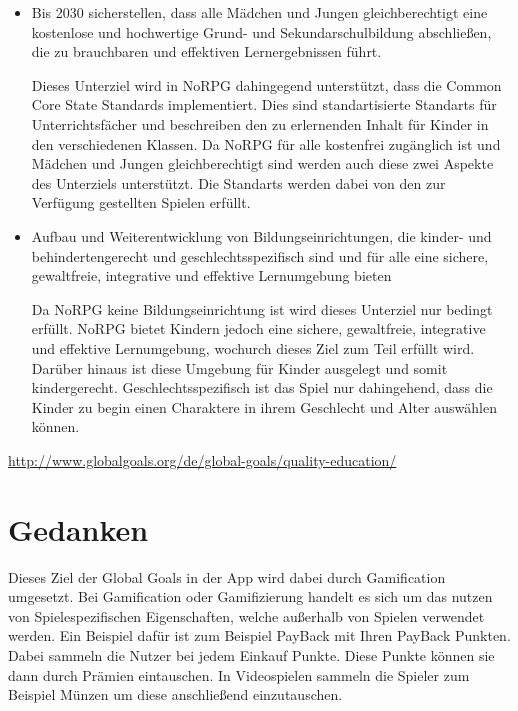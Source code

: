 \begin{itemize}
\item Bis 2030 sicherstellen, dass alle Mädchen und Jungen gleichberechtigt eine kostenlose und hochwertige Grund- und Sekundarschulbildung abschließen, die zu brauchbaren und effektiven Lernergebnissen führt.

Dieses Unterziel wird in NoRPG dahingegend unterstützt, dass die Common Core State Standards implementiert. Dies sind standartisierte Standarts für Unterrichtsfächer und beschreiben den zu erlernenden Inhalt für Kinder in den verschiedenen Klassen. Da NoRPG für alle kostenfrei zugänglich ist und Mädchen und Jungen gleichberechtigt sind werden auch diese zwei Aspekte des Unterziels unterstützt. Die Standarts werden dabei von den zur Verfügung gestellten Spielen erfüllt.

\item Aufbau und Weiterentwicklung von Bildungseinrichtungen, die kinder- und behindertengerecht und geschlechtsspezifisch sind und für alle eine sichere, gewaltfreie, integrative und effektive Lernumgebung bieten

Da NoRPG keine Bildungseinrichtung ist wird dieses Unterziel nur bedingt erfüllt. NoRPG bietet Kindern jedoch eine sichere, gewaltfreie, integrative und effektive Lernumgebung, wochurch dieses Ziel zum Teil erfüllt wird. Darüber hinaus ist diese Umgebung für Kinder ausgelegt und somit kindergerecht. Geschlechtsspezifisch ist das Spiel nur dahingehend, dass die Kinder zu begin einen Charaktere in ihrem Geschlecht und Alter auswählen können.

\end{itemize}

	\url{http://www.globalgoals.org/de/global-goals/quality-education/}

	
\section{Gedanken}

Dieses Ziel der Global Goals in der App wird dabei durch Gamification umgesetzt. Bei Gamification oder Gamifizierung handelt es sich um das nutzen von Spielespezifischen Eigenschaften, welche außerhalb von Spielen verwendet werden. Ein Beispiel dafür ist zum Beispiel PayBack mit Ihren PayBack Punkten. Dabei sammeln die Nutzer bei jedem Einkauf Punkte. Diese Punkte können sie dann durch Prämien eintauschen. In Videospielen sammeln die Spieler zum Beispiel Münzen um diese anschließend einzutauschen. 

